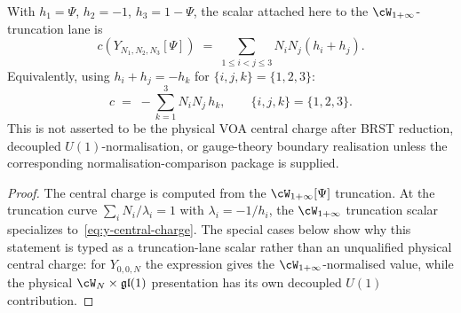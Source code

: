 \begin{theorem}%
\label{thm:y-central-charge}
With $h_1 = \Psi$, $h_2 = -1$, $h_3 = 1 - \Psi$, the
scalar attached here to the \(\cW_{1+\infty}\)-truncation lane is
\begin{equation}\label{eq:y-central-charge}
c(Y_{N_1,N_2,N_3}[\Psi])
\;=\;
\sum_{1 \leq i < j \leq 3} N_i N_j (h_i + h_j).
\end{equation}
Equivalently, using $h_i + h_j = -h_k$ for $\{i,j,k\} = \{1,2,3\}$:
\begin{equation}\label{eq:y-central-charge-alt}
c \;=\; -\sum_{k=1}^3 N_i N_j\, h_k,
\qquad
\{i,j,k\} = \{1,2,3\}.
\end{equation}
This is not asserted to be the physical VOA central charge after BRST
reduction, decoupled \(U(1)\)-normalisation, or gauge-theory boundary
realisation unless the corresponding normalisation-comparison package
is supplied.
\end{theorem}

\begin{proof}
The central charge is computed from the $\cW_{1+\infty}[\Psi]$
truncation. At the truncation curve
$\sum_i N_i/\lambda_i = 1$ with $\lambda_i = -1/h_i$, the
$\cW_{1+\infty}$ truncation scalar specializes
to~\eqref{eq:y-central-charge}.  The special cases below show why this
statement is typed as a truncation-lane scalar rather than an
unqualified physical central charge: for \(Y_{0,0,N}\) the expression
gives the \(\cW_{1+\infty}\)-normalised value, while the physical
\(\cW_N\times\mathfrak{gl}(1)\) presentation has its own decoupled
\(U(1)\) contribution.
\end{proof}

